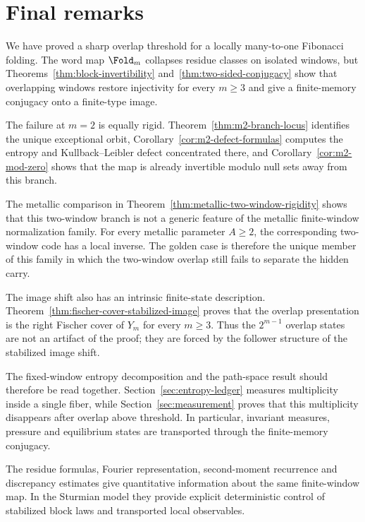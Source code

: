 \section{Final remarks}\label{sec:discussion}

We have proved a sharp overlap threshold for a locally many-to-one Fibonacci folding.  The word map $\Fold_m$ collapses residue classes on isolated windows, but Theorems~\ref{thm:block-invertibility} and~\ref{thm:two-sided-conjugacy} show that overlapping windows restore injectivity for every $m\ge 3$ and give a finite-memory conjugacy onto a finite-type image.

The failure at $m=2$ is equally rigid.  Theorem~\ref{thm:m2-branch-locus} identifies the unique exceptional orbit, Corollary~\ref{cor:m2-defect-formulas} computes the entropy and Kullback--Leibler defect concentrated there, and Corollary~\ref{cor:m2-mod-zero} shows that the map is already invertible modulo null sets away from this branch.

The metallic comparison in Theorem~\ref{thm:metallic-two-window-rigidity} shows that this two-window branch is not a generic feature of the metallic finite-window normalization family.  For every metallic parameter $A\ge2$, the corresponding two-window code has a local inverse.  The golden case is therefore the unique member of this family in which the two-window overlap still fails to separate the hidden carry.

The image shift also has an intrinsic finite-state description.  Theorem~\ref{thm:fischer-cover-stabilized-image} proves that the overlap presentation is the right Fischer cover of $Y_m$ for every $m\ge3$.  Thus the $2^{m-1}$ overlap states are not an artifact of the proof; they are forced by the follower structure of the stabilized image shift.

The fixed-window entropy decomposition and the path-space result should therefore be read together.  Section~\ref{sec:entropy-ledger} measures multiplicity inside a single fiber, while Section~\ref{sec:measurement} proves that this multiplicity disappears after overlap above threshold.  In particular, invariant measures, pressure and equilibrium states are transported through the finite-memory conjugacy.

The residue formulas, Fourier representation, second-moment recurrence and discrepancy estimates give quantitative information about the same finite-window map.  In the Sturmian model they provide explicit deterministic control of stabilized block laws and transported local observables.

